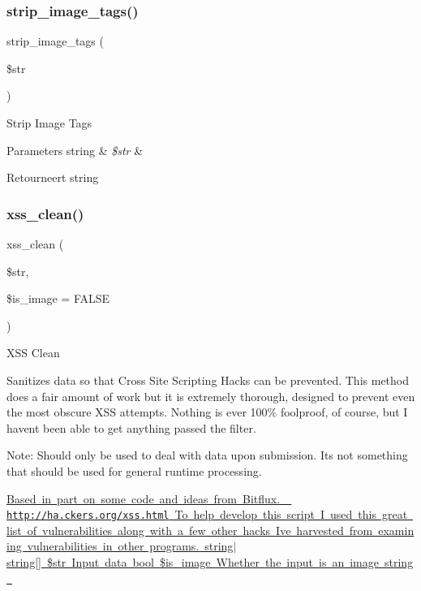 \subsubsection{\texorpdfstring{strip\_image\_tags()}{strip\_image\_tags()}}
{\footnotesize\ttfamily strip\+\_\+image\+\_\+tags (\begin{DoxyParamCaption}\item[{}]{\$str }\end{DoxyParamCaption})}

Strip Image Tags


\begin{DoxyParams}[1]{Parameters}
string & {\em \$str} & \\
\hline
\end{DoxyParams}
\begin{DoxyReturn}{Retourneert}
string 
\end{DoxyReturn}
\mbox{\label{class_c_i___security_acb759426dbab128d3d8164805225381c}} 
\subsubsection{\texorpdfstring{xss\_clean()}{xss\_clean()}}
{\footnotesize\ttfamily xss\+\_\+clean (\begin{DoxyParamCaption}\item[{}]{\$str,  }\item[{}]{\$is\+\_\+image = {\ttfamily FALSE} }\end{DoxyParamCaption})}

X\+SS Clean

Sanitizes data so that Cross Site Scripting Hacks can be prevented. This method does a fair amount of work but it is extremely thorough, designed to prevent even the most obscure X\+SS attempts. Nothing is ever 100\% foolproof, of course, but I haven\textquotesingle{}t been able to get anything passed the filter.

Note\+: Should only be used to deal with data upon submission. It\textquotesingle{}s not something that should be used for general runtime processing.

\mbox{\hyperlink{}{Based in part on some code and ideas from Bitflux.  \href{http://ha.ckers.org/xss.html}{\texttt{ http\+://ha.\+ckers.\+org/xss.\+html}} To help develop this script I used this great list of vulnerabilities along with a few other hacks I\textquotesingle{}ve harvested from examining vulnerabilities in other programs.  string$\vert$string\mbox{[}\mbox{]} \$str Input data  bool \$is\+\_\+image Whether the input is an image  string }}\mbox{\label{class_c_i___security_ae2f831d3f277e1c03730b28fd1734186}} 
